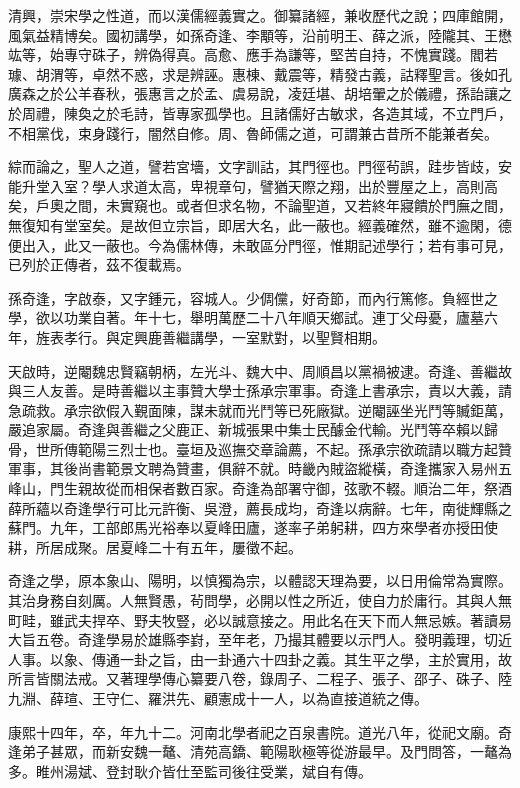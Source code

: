 \begin{pinyinscope}
清興，崇宋學之性道，而以漢儒經義實之。御纂諸經，兼收歷代之說；四庫館開，風氣益精博矣。國初講學，如孫奇逢、李顒等，沿前明王、薛之派，陸隴其、王懋竑等，始專守硃子，辨偽得真。高愈、應手為謙等，堅苦自持，不愧實踐。閻若璩、胡渭等，卓然不惑，求是辨誣。惠棟、戴震等，精發古義，詁釋聖言。後如孔廣森之於公羊春秋，張惠言之於孟、虞易說，凌廷堪、胡培翬之於儀禮，孫詒讓之於周禮，陳奐之於毛詩，皆專家孤學也。且諸儒好古敏求，各造其域，不立門戶，不相黨伐，束身踐行，闇然自修。周、魯師儒之道，可謂兼古昔所不能兼者矣。

綜而論之，聖人之道，譬若宮墻，文字訓詁，其門徑也。門徑茍誤，跬步皆歧，安能升堂入室？學人求道太高，卑視章句，譬猶天際之翔，出於豐屋之上，高則高矣，戶奧之間，未實窺也。或者但求名物，不論聖道，又若終年寢饋於門廡之間，無復知有堂室矣。是故但立宗旨，即居大名，此一蔽也。經義確然，雖不逾閑，德便出入，此又一蔽也。今為儒林傳，未敢區分門徑，惟期記述學行；若有事可見，已列於正傳者，茲不復載焉。

孫奇逢，字啟泰，又字鍾元，容城人。少倜儻，好奇節，而內行篤修。負經世之學，欲以功業自著。年十七，舉明萬歷二十八年順天鄉試。連丁父母憂，廬墓六年，旌表孝行。與定興鹿善繼講學，一室默對，以聖賢相期。

天啟時，逆閹魏忠賢竊朝柄，左光斗、魏大中、周順昌以黨禍被逮。奇逢、善繼故與三人友善。是時善繼以主事贊大學士孫承宗軍事。奇逢上書承宗，責以大義，請急疏救。承宗欲假入覲面陳，謀未就而光鬥等已死廠獄。逆閹誣坐光鬥等贓鉅萬，嚴追家屬。奇逢與善繼之父鹿正、新城張果中集士民醵金代輸。光鬥等卒賴以歸骨，世所傳範陽三烈士也。臺垣及巡撫交章論薦，不起。孫承宗欲疏請以職方起贊軍事，其後尚書範景文聘為贊畫，俱辭不就。時畿內賊盜縱橫，奇逢攜家入易州五峰山，門生親故從而相保者數百家。奇逢為部署守御，弦歌不輟。順治二年，祭酒薛所蘊以奇逢學行可比元許衡、吳澄，薦長成均，奇逢以病辭。七年，南徙輝縣之蘇門。九年，工部郎馬光裕奉以夏峰田廬，遂率子弟躬耕，四方來學者亦授田使耕，所居成聚。居夏峰二十有五年，屢徵不起。

奇逢之學，原本象山、陽明，以慎獨為宗，以體認天理為要，以日用倫常為實際。其治身務自刻厲。人無賢愚，茍問學，必開以性之所近，使自力於庸行。其與人無町畦，雖武夫捍卒、野夫牧豎，必以誠意接之。用此名在天下而人無忌嫉。著讀易大旨五卷。奇逢學易於雄縣李崶，至年老，乃撮其體要以示門人。發明義理，切近人事。以象、傳通一卦之旨，由一卦通六十四卦之義。其生平之學，主於實用，故所言皆關法戒。又著理學傳心纂要八卷，錄周子、二程子、張子、邵子、硃子、陸九淵、薛瑄、王守仁、羅洪先、顧憲成十一人，以為直接道統之傳。

康熙十四年，卒，年九十二。河南北學者祀之百泉書院。道光八年，從祀文廟。奇逢弟子甚眾，而新安魏一鼇、清苑高鐈、範陽耿極等從游最早。及門問答，一鼇為多。睢州湯斌、登封耿介皆仕至監司後往受業，斌自有傳。


\end{pinyinscope}
